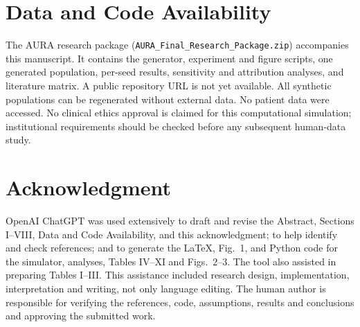 \documentclass[conference]{IEEEtran}
\begin{document}
\section*{Data and Code Availability}
The AURA research package (\texttt{AURA\_Final\_Research\_Package.zip}) accompanies this manuscript. It contains the generator, experiment and figure scripts, one generated population, per-seed results, sensitivity and attribution analyses, and literature matrix. A public repository URL is not yet available. All synthetic populations can be regenerated without external data. No patient data were accessed. No clinical ethics approval is claimed for this computational simulation; institutional requirements should be checked before any subsequent human-data study.
\section*{Acknowledgment}
OpenAI ChatGPT was used extensively to draft and revise the Abstract, Sections I--VIII, Data and Code Availability, and this acknowledgment; to help identify and check references; and to generate the LaTeX, Fig.~1, and Python code for the simulator, analyses, Tables IV--XI and Figs.~2--3. The tool also assisted in preparing Tables I--III. This assistance included research design, implementation, interpretation and writing, not only language editing. The human author is responsible for verifying the references, code, assumptions, results and conclusions and approving the submitted work.
\end{document}
